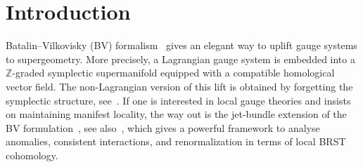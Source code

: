 \documentclass[pdftex]{sigma}
\numberwithin{equation}{section}
\theoremstyle{definition}
\newcommand{\fZ}{\mathbb{Z}}
\begin{document}


\section{Introduction}

Batalin--Vilkovisky (BV) formalism~\cite{Batalin:1981jr,Batalin:1983wj} gives an elegant way to uplift gauge systems to supergeometry. More precisely, a Lagrangian gauge system is embedded into a $\fZ$-graded symplectic supermanifold equipped with a compatible homological vector field. The non-Lagrangian version of this lift is obtained by forgetting the symplectic structure, see~\cite{Barnich:2004cr,Kazinski:2005eb,Sharapov:2016sgx}. If one is interested in local gauge theories and insists on maintaining manifest locality, the way out is the jet-bundle extension of the BV formulation~\cite{Barnich:1995ap, Barnich:1995db}, see also~\cite{Barnich:2000zw,Henneaux:1990rx,Piguet:1995er}, which gives a powerful framework to analyse anomalies, consistent interactions, and renormalization in terms of local BRST cohomology.
\end{document}

